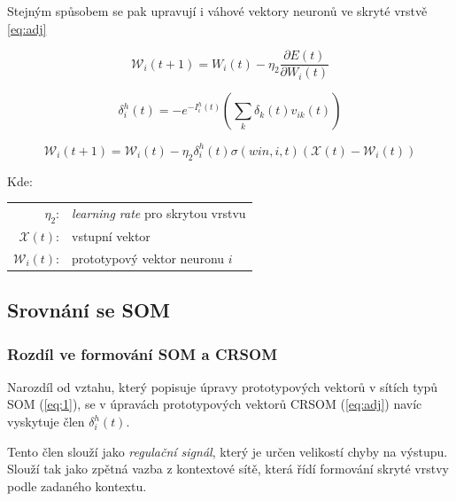 \documentclass[thesis=M,czech]{FITthesis}[2012/06/26]
\begin{document}
    

Stejným spůsobem se pak upravují i váhové vektory neuronů ve skryté vrstvě \ref{eq:adj}
  
  \vspace{\baselineskip}
\noindent
  \begin{minipage}[c]{\textwidth }

\begin{equation*}
   \mathcal{W}_i(t+1)=W_i(t) -  \eta_2\frac{\partial{E(t)}}{\partial{W_i(t)}} 
\end{equation*}

\begin{equation*}
   \delta_i^h(t)=-e^{-I_i^h(t)}(\sum\limits_k{\delta_k(t)v_{ik}(t)})
\end{equation*}

\begin{equation}\label{eq:adj}
   \mathcal{W}_i(t+1)=\mathcal{W}_i(t) -  \eta_2\delta_i^h(t)\sigma(win, i, t)(\mathcal{X}(t) - \mathcal{W}_i(t))
\end{equation}

Kde:\\
\hspace*{3em}
\begin{tabular}{rl}
    $\eta_2$:& \textit{learning rate} pro skrytou vrstvu \\
        $\mathcal{X}(t)$:& vstupní vektor \\
            $\mathcal{W}_i(t)$:& prototypový vektor neuronu $i$ \\
\end{tabular}
\end{minipage} 
\vspace{\baselineskip}
\noindent
 

\subsection{Srovnání se SOM }
\subsubsection*{Rozdíl ve formování SOM a CRSOM}
Narozdíl od vztahu, který popisuje úpravy prototypových vektorů v sítích typů SOM (\ref{eq:1}), se v úpravách prototypových vektorů CRSOM (\ref{eq:adj}) navíc vyskytuje člen $\delta_i^h(t)$.

Tento člen slouží jako \textit{regulační signál}, který je určen velikostí chyby na výstupu. Slouží tak jako zpětná vazba z kontextové sítě, která řídí formování skryté vrstvy podle zadaného kontextu.
\end{document}
